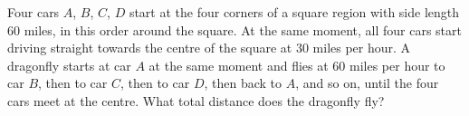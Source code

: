 Four cars $A$, $B$, $C$, $D$ start at the four corners of a square region with side length $60$ miles, in this order around the square. At the same moment, all four cars start driving straight towards the centre of the square at $30$ miles per hour. A dragonfly starts at car $A$ at the same moment and flies at $60$ miles per hour to car $B$, then to car $C$, then to car $D$, then back to $A$, and so on, until the four cars meet at the centre. What total distance does the dragonfly fly?
